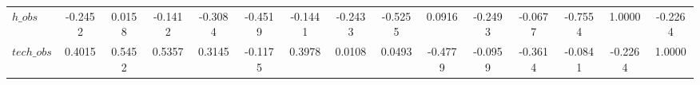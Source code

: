 \begin{center}
\begin{longtable}{lcccccccccccccc}
$h\_obs         $	 & 	          -0.2452	 & 	           0.0158	 & 	          -0.1412	 & 	          -0.3084	 & 	          -0.4519	 & 	          -0.1441	 & 	          -0.2433	 & 	          -0.5255	 & 	           0.0916	 & 	          -0.2493	 & 	          -0.0677	 & 	          -0.7554	 & 	           1.0000	 & 	          -0.2264 \\ 
$tech\_obs      $	 & 	           0.4015	 & 	           0.5452	 & 	           0.5357	 & 	           0.3145	 & 	          -0.1175	 & 	           0.3978	 & 	           0.0108	 & 	           0.0493	 & 	          -0.4779	 & 	          -0.0959	 & 	          -0.3614	 & 	          -0.0841	 & 	          -0.2264	 & 	           1.0000 \\ 
\end{longtable}
 \end{center}
